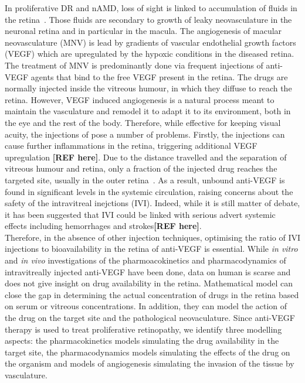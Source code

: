 \documentclass[12pt,a4paper]{article}
\begin{document}
In proliferative DR and nAMD, loss of sight is linked to accumulation of fluids in the retina~\cite{Waldstein_2016, Roberts_2020}.
Those fluids are secondary to growth of leaky neovasculature in the neuronal retina and in particular in the macula.
The angiogenesis of macular neovasculature (MNV) is lead by gradients of vascular endothelial growth factors (VEGF) which are upregulated by the hypoxic conditions in the diseased retina.
The treatment of MNV is predominantly done via frequent injections of anti-VEGF agents that bind to the free VEGF present in the retina.
The drugs are normally injected inside the vitreous humour, in which they diffuse to reach the retina.
However, VEGF induced angiogenesis is a natural process meant to maintain the vasculature and remodel it to adapt it to its environment, both in the eye and the rest of the body.
Therefore, while effective for keeping visual acuity, the injections of pose a number of problems.
Firstly, the injections can cause further inflammations in the retina, triggering additional VEGF upregulation \textbf{[REF here]}.
Due to the distance travelled and the separation of vitreous humour and retina, only a fraction of the injected drug reaches the targeted site, usually in the outer retina~\cite{park_intraocular_2015}.
As a result, unbound anti-VEGF is found in significant levels in the systemic circulation, raising concerns about the safety of the intravitreal inejctions (IVI).
Indeed, while it is still matter of debate, it has been suggested that IVI could be linked with serious advert systemic effects including hemorrhages and strokes\textbf{[REF here]}. \\
Therefore, in the absence of other injection techniques, optimising the ratio of IVI injections to bioavailability in the retina of anti-VEGF is essential.
While \textit{in vitro} and \textit{in vivo} investigations of the pharmoacokinetics and pharmacodynamics of intravitreally injected anti-VEGF have been done, data on human is scarse and does not give insight on drug availability in the retina.
Mathematical model can close the gap in determining the actual concentration of drugs in the retina based on serum or vitreous concentrations.
In addition, they can model the action of the drug on the target site and the pathological neovaculature.
Since anti-VEGF therapy is used to treat proliferative retinopathy, we identify three modelling aspects: the pharmacokinetics models simulating the drug availability in the target site, the pharmacodynamics models simulating the effects of the drug on the organism and models of angiogenesis simulating the invasion of the tissue by vasculature.
\end{document}
